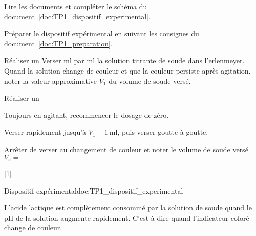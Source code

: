 \numeroQuestion Lire les documents et compléter le schéma du document~\ref{doc:TP1_dispositif_experimental}.

\mesure Préparer le dispositif expérimental en suivant les consignes du document~\ref{doc:TP1_preparation}.

\mesure Réaliser un 
Verser \unit{\ml} par \unit{\ml} la solution titrante de soude dans l'erlenmeyer.
Quand la solution change de couleur et que la couleur persiste après agitation, noter la valeur approximative $V_1$ du volume de soude versé.

\mesure Réaliser un 
\begin{protocole}
  \item Toujours en agitant, recommencer le dosage de zéro.
  \item Verser rapidement jusqu'à $V_1 - \qty{1}{\ml}$, puis verser goutte-à-goutte.
  \item Arrêter de verser au changement de couleur et noter le volume de soude versé $V_e =$ 
\end{protocole}

[1]


\begin{doc}{Dispositif expérimental}{doc:TP1_dispositif_experimental}
  \begin{center}
  \end{center}
  
  L'acide lactique est complètement consommé par la solution de soude quand le pH de la solution augmente rapidement.
  C'est-à-dire quand l'indicateur coloré change de couleur.
\end{doc}

